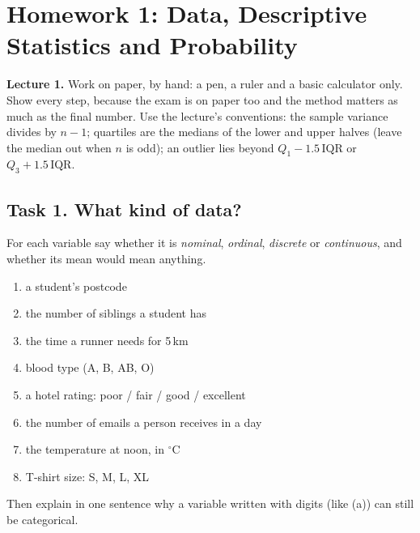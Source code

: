 

\section*{Homework 1: Data, Descriptive Statistics and Probability}
\noindent\textbf{Lecture 1.} Work on paper, by hand: a pen, a ruler and a basic calculator only. Show every step,
because the exam is on paper too and the method matters as much as the final number. Use the lecture's conventions: the
sample variance divides by $n-1$; quartiles are the medians of the lower and upper halves (leave the median out when
$n$ is odd); an outlier lies beyond $Q_1 - 1.5\,\mathrm{IQR}$ or $Q_3 + 1.5\,\mathrm{IQR}$.

\subsection*{Task 1. What kind of data?}
For each variable say whether it is \emph{nominal}, \emph{ordinal}, \emph{discrete} or \emph{continuous}, and whether
its mean would mean anything.
\begin{enumerate}[label=(\alph*), itemsep=0pt]
  \item a student's postcode
  \item the number of siblings a student has
  \item the time a runner needs for 5\,km
  \item blood type (A, B, AB, O)
  \item a hotel rating: poor / fair / good / excellent
  \item the number of emails a person receives in a day
  \item the temperature at noon, in $^\circ$C
  \item T-shirt size: S, M, L, XL
\end{enumerate}
Then explain in one sentence why a variable written with digits (like (a)) can still be categorical.

